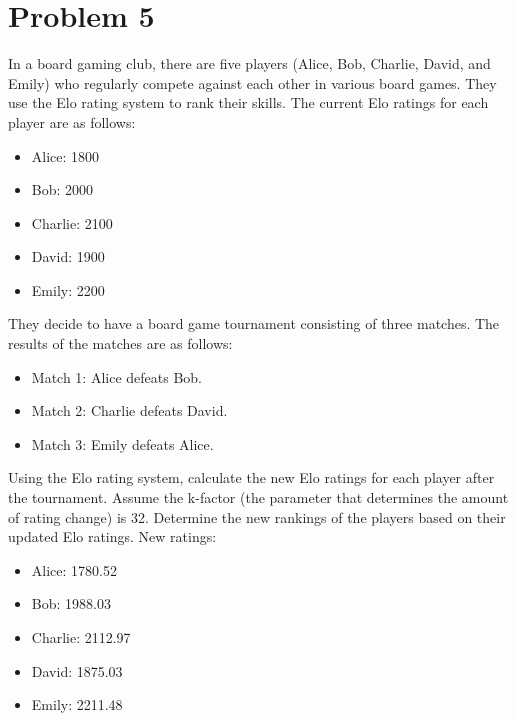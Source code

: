 \documentclass{article}
\begin{document}
\section*{Problem 5}
In a board gaming club, there are five players (Alice, Bob, Charlie, David, and Emily) who regularly compete against each other in various board games. They use the Elo rating system to rank their skills. The current Elo ratings for each player are as follows:
\begin{itemize}
    \item Alice: 1800
    \item Bob: 2000
    \item Charlie: 2100
    \item David: 1900
    \item Emily: 2200
\end{itemize}
They decide to have a board game tournament consisting of three matches. The results of the matches are as follows:
\begin{itemize}
    \item Match 1: Alice defeats Bob.
    \item Match 2: Charlie defeats David.
    \item Match 3: Emily defeats Alice.
\end{itemize}
Using the Elo rating system, calculate the new Elo ratings for each player after the tournament. Assume the k-factor (the parameter that determines the amount of rating change) is 32. Determine the new rankings of the players based on their updated Elo ratings. New ratings:\begin{itemize}
    \item Alice: 1780.52
    \item Bob: 1988.03
    \item Charlie: 2112.97
    \item David: 1875.03
    \item Emily: 2211.48
\end{itemize}
\end{document}
